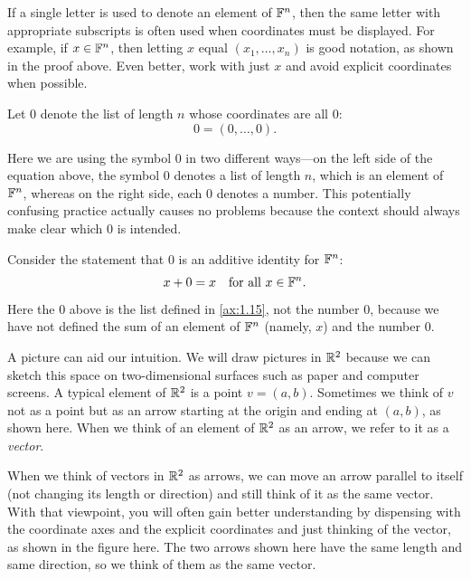 %
If a single letter is used to denote an element of $\mathbb{F}^n$, then the same letter
with appropriate subscripts is often used when coordinates must be displayed.
For example, if $x\in\mathbb{F}^n$, then letting $x$ equal $(x_1,\dots,x_n)$ is good
notation, as shown in the proof above. Even better, work with just $x$ and
avoid explicit coordinates when possible.

\begin{notation}[$0$]\label{ax:1.15}
Let $0$ denote the list of length $n$ whose coordinates are all $0$:
\[ 0 = (0,\dots,0). \]
\end{notation}

Here we are using the symbol $0$ in two different ways---on the left side of
the equation above, the symbol $0$ denotes a list of length $n$, which is an
element of $\mathbb{F}^n$, whereas on the right side, each $0$ denotes a number. This
potentially confusing practice actually causes no problems because the context
should always make clear which $0$ is intended.

\begin{example}\label{ax:1.16}
Consider the statement that $0$ is an additive identity for $\mathbb{F}^n$:
\[ x+0=x \quad\text{for all } x\in\mathbb{F}^n. \]
Here the $0$ above is the list defined in \ref{ax:1.15}, not the number $0$,
because we have not defined the sum of an element of $\mathbb{F}^n$ (namely, $x$) and
the number $0$.
\end{example}

%
A picture can aid our intuition. We will draw pictures in $\mathbb{R}^2$ because we can
sketch this space on two-dimensional surfaces such as paper and computer
screens. A typical element of $\mathbb{R}^2$ is a point $v=(a,b)$. Sometimes we think
of $v$ not as a point but as an arrow starting at the origin and ending at
$(a,b)$, as shown here. When we think of an element of $\mathbb{R}^2$ as an arrow, we
refer to it as a \emph{vector}.

%
When we think of vectors in $\mathbb{R}^2$ as arrows, we can move an arrow parallel to
itself (not changing its length or direction) and still think of it as the same
vector. With that viewpoint, you will often gain better understanding by
dispensing with the coordinate axes and the explicit coordinates and just
thinking of the vector, as shown in the figure here. The two arrows shown here
have the same length and same direction, so we think of them as the same
vector.

